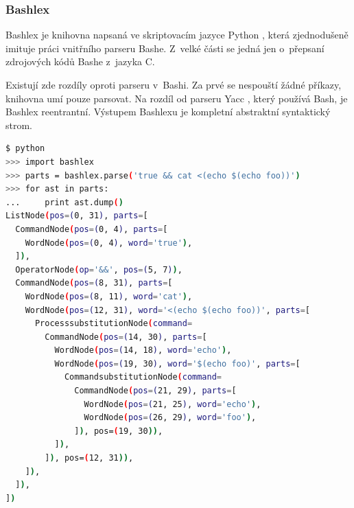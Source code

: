 \documentclass[thesis=M,czech]{FITthesis}[2012/06/26]
\begin{document}





%
%
%
\subsubsection{Bashlex}\label{sec:bashlex}

Bashlex \cite{bashlex} je knihovna napsaná ve skriptovacím jazyce Python \cite{Python}, která zjednodušeně imituje práci vnitřního parseru Bashe. Z~velké části se jedná jen o~přepsaní zdrojových kódů Bashe z~jazyka C.

Existují zde rozdíly oproti parseru v~Bashi. Za prvé se nespouští žádné příkazy, knihovna umí pouze parsovat. Na rozdíl od parseru Yacc \cite{yacc}, který používá Bash, je Bashlex reentrantní. Výstupem Bashlexu je kompletní abstraktní syntaktický strom.

\begin{minipage}{\linewidth}
\begin{lstlisting}[language=bash, caption={Výstup z~knihovny Bashlex}, label={lst:bashlex}]
$ python
>>> import bashlex
>>> parts = bashlex.parse('true && cat <(echo $(echo foo))')
>>> for ast in parts:
...     print ast.dump()
ListNode(pos=(0, 31), parts=[
  CommandNode(pos=(0, 4), parts=[
    WordNode(pos=(0, 4), word='true'),
  ]),
  OperatorNode(op='&&', pos=(5, 7)),
  CommandNode(pos=(8, 31), parts=[
    WordNode(pos=(8, 11), word='cat'),
    WordNode(pos=(12, 31), word='<(echo $(echo foo))', parts=[
      ProcesssubstitutionNode(command=
        CommandNode(pos=(14, 30), parts=[
          WordNode(pos=(14, 18), word='echo'),
          WordNode(pos=(19, 30), word='$(echo foo)', parts=[
            CommandsubstitutionNode(command=
              CommandNode(pos=(21, 29), parts=[
                WordNode(pos=(21, 25), word='echo'),
                WordNode(pos=(26, 29), word='foo'),
              ]), pos=(19, 30)),
          ]),
        ]), pos=(12, 31)),
    ]),
  ]),
])
\end{lstlisting}
\end{minipage}
\end{document}
